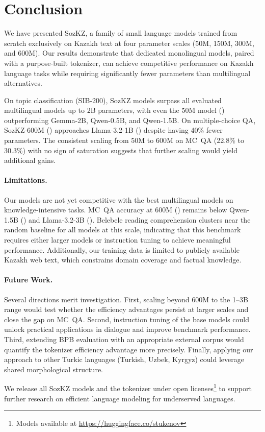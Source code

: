 \section{Conclusion}
\label{sec:conclusion}

We have presented SozKZ, a family of small language models trained
from scratch exclusively on Kazakh text at four parameter scales
(50M, 150M, 300M, and 600M).  Our results demonstrate that dedicated
monolingual models, paired with a purpose-built tokenizer, can achieve
competitive performance on Kazakh language tasks while requiring
significantly fewer parameters than multilingual alternatives.

On topic classification (SIB-200), SozKZ models surpass all evaluated
multilingual models up to 2B parameters, with even the 50M model
(\accSibTwoHundredSozKZFiftyM{}) outperforming Gemma-2B, Qwen-0.5B,
and Qwen-1.5B.  On multiple-choice QA, SozKZ-600M
(\accMcQaSozKZSixHundredM{}) approaches Llama-3.2-1B
(\accMcQaLlamaThreeOneB{}) despite having 40\% fewer parameters.
The consistent scaling from 50M to 600M on MC~QA (22.8\% to 30.3\%)
with no sign of saturation suggests that further scaling would yield
additional gains.

\paragraph{Limitations.}
Our models are not yet competitive with the best multilingual models
on knowledge-intensive tasks.  MC~QA accuracy at 600M
(\accMcQaSozKZSixHundredM{}) remains below Qwen-1.5B
(\accMcQaQwenOneFiveB{}) and Llama-3.2-3B (\accMcQaLlamaThreeThreeB{}).
Belebele reading comprehension clusters near the random baseline for
all models at this scale, indicating that this benchmark requires either
larger models or instruction tuning to achieve meaningful performance.
Additionally, our training data is limited to publicly available
Kazakh web text, which constrains domain coverage and factual knowledge.

\paragraph{Future Work.}
Several directions merit investigation.  First, scaling beyond 600M
to the 1--3B range would test whether the efficiency advantages persist
at larger scales and close the gap on MC~QA.  Second, instruction tuning
of the base models could unlock practical applications in dialogue and
improve benchmark performance.  Third, extending BPB evaluation with
an appropriate external corpus would quantify the tokenizer efficiency
advantage more precisely.  Finally, applying our approach to other
Turkic languages (Turkish, Uzbek, Kyrgyz) could leverage shared
morphological structure.

We release all SozKZ models and the tokenizer under open
licenses\footnote{Models available at
\url{https://huggingface.co/stukenov}} to support further research
on efficient language modeling for underserved languages.
